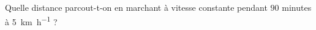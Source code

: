 
\begin{mental}
    Quelle distance parcout-t-on en marchant à vitesse constante pendant \( 90\) minutes à \SI{5}{\kilo\meter\per\hour} ?
\end{mental}
